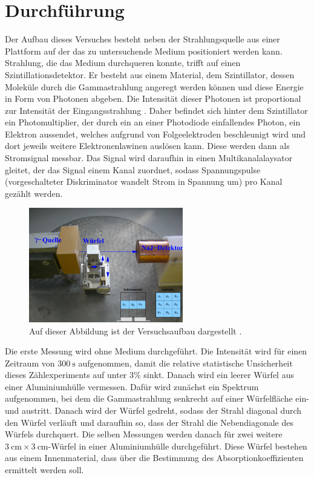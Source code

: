 \section{Durchführung}
\label{sec:Durchführung}

Der Aufbau dieses Versuches besteht neben der Strahlungsquelle aus einer Plattform auf der
das zu untersuchende Medium positioniert werden kann. 
Strahlung, die das Medium durchqueren konnte, trifft auf einen Szintillationsdetektor.
Er besteht aus einem Material, dem Szintillator, dessen Moleküle durch die 
Gammastrahlung angeregt werden können und diese Energie in Form von Photonen abgeben.
Die Intensität dieser Photonen ist proportional zur Intensität der Eingangsstrahlung .
Daher befindet sich hinter dem Szintillator ein 
Photomultiplier, der durch ein an einer Photodiode einfallendes Photon, ein Elektron 
aussendet, welches aufgrund von Folgeelektroden beschleunigt wird und dort jeweils weitere Elektronenlawinen 
auslösen kann. Diese werden dann als Stromsignal messbar. Das Signal wird daraufhin in 
einen Multikanalalaysator gleitet, der das Signal einem Kanal zuordnet, sodass Spannungspulse
(vorgeschalteter Diskriminator wandelt Strom in Spannung um) 
pro Kanal gezählt werden.

\begin{figure}
	\centering
	\includegraphics[width=0.6\textwidth]{figure/Aufbau.pdf}
	\caption{Auf dieser Abbildung ist der Versuchsaufbau dargestellt \cite{sample}.}
	\label{abb3}
\end{figure}

Die erste Messung wird ohne Medium durchgeführt. Die Intensität wird  für einen Zeitraum von 
$\SI{300}{\second}$
aufgenommen, damit die relative statistische Unsicherheit dieses Zählexperiments auf
unter 3\% sinkt.
Danach wird ein leerer Würfel aus einer Aluminiumhülle vermessen. Dafür wird 
zunächst ein Spektrum aufgenommen, bei dem die Gammastrahlung senkrecht auf einer 
Würfelfläche ein- und austritt. Danach wird der Würfel gedreht, sodass der Strahl diagonal 
durch den Würfel verläuft und daraufhin so, dass der Strahl die Nebendiagonale des 
Würfels durchquert. Die selben Messungen werden danach für zwei weitere $\SI{3}{\centi\meter} \times \SI{3}{\centi\meter}$-Würfel 
in einer Aluminiumhülle durchgeführt. Diese Würfel bestehen aus einem Innenmaterial, dass 
über die Bestimmung des Absorptionkoeffizienten ermittelt werden soll. 

